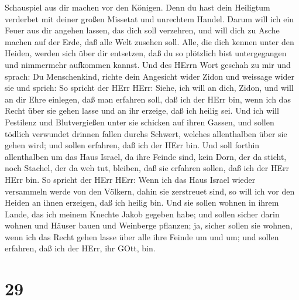 Schauspiel aus dir machen vor den Königen.  Denn du hast
dein Heiligtum verderbet mit deiner großen Missetat und unrechtem
Handel. Darum will ich ein Feuer aus dir angehen lassen, das dich soll
verzehren, und will dich zu Asche machen auf der Erde, daß alle Welt
zusehen soll.  Alle, die dich kennen unter den Heiden,
werden sich über dir entsetzen, daß du so plötzlich bist untergegangen
und nimmermehr aufkommen kannst.  Und des HErrn Wort
geschah zu mir und sprach:  Du Menschenkind, richte dein
Angesicht wider Zidon und weissage wider sie  und sprich:
So spricht der HErr HErr: Siehe, ich will an dich, Zidon, und will an
dir Ehre einlegen, daß man erfahren soll, daß ich der HErr bin, wenn ich
das Recht über sie gehen lasse und an ihr erzeige, daß ich heilig sei.
 Und ich will Pestilenz und Blutvergießen unter sie
schicken auf ihren Gassen, und sollen tödlich verwundet drinnen fallen
durchs Schwert, welches allenthalben über sie gehen wird; und sollen
erfahren, daß ich der HErr bin.  Und soll forthin
allenthalben um das Haus Israel, da ihre Feinde sind, kein Dorn, der da
sticht, noch Stachel, der da weh tut, bleiben, daß sie erfahren sollen,
daß ich der HErr HErr bin.  So spricht der HErr HErr: Wenn
ich das Haus Israel wieder versammeln werde von den Völkern, dahin sie
zerstreuet sind, so will ich vor den Heiden an ihnen erzeigen, daß ich
heilig bin. Und sie sollen wohnen in ihrem Lande, das ich meinem Knechte
Jakob gegeben habe;  und sollen sicher darin wohnen und
Häuser bauen und Weinberge pflanzen; ja, sicher sollen sie wohnen, wenn
ich das Recht gehen lasse über alle ihre Feinde um und um; und sollen
erfahren, daß ich der HErr, ihr GOtt, bin.

\hypertarget{section-28}{%
\section{29}\label{section-28}}

